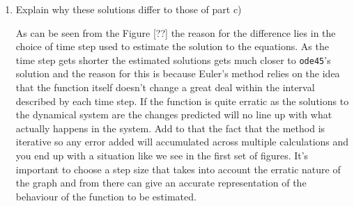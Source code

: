 \documentclass[11pt]{report}
\begin{document}
\begin{enumerate}[label=\alph*)]
\begin{enumerate}[label=\roman*)]
				\item Explain why these solutions differ to those of part c)
				
				As can be seen from the Figure [??] the reason for the difference lies in the choice of time step used to estimate the solution to the equations. As the time step gets shorter the estimated solutions gets much closer to \texttt{ode45}'s solution and the reason for this is because Euler's method relies on the idea that the function itself doesn't change a great deal within the interval described by each time step. If the function is quite erratic as the solutions to the dynamical system are the changes predicted will no line up with what actually happens in the system. Add to that the fact that the method is iterative so any error added will accumulated across multiple calculations and you end up with a situation like we see in the first set of figures. It's important to choose a step size that takes into account the erratic nature of the graph and from there can give an accurate representation of the behaviour of the function to be estimated.
				
			\end{enumerate}
	\end{enumerate}
	
	
	
\end{document}
